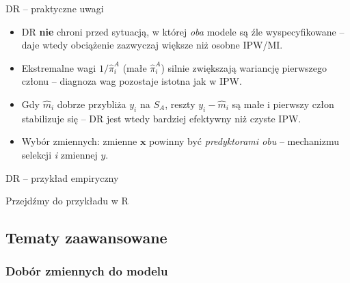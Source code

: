 \documentclass[10pt,ignorenonframetext, aspectratio=169]{beamer}
\newcommand{\bx}{\boldsymbol{x}}
\begin{document}
\begin{frame}{DR -- praktyczne uwagi}
\begin{itemize}
\justifying
    \item DR \textbf{nie} chroni przed sytuacją, w której \emph{oba} modele są źle wyspecyfikowane -- daje wtedy obciążenie zazwyczaj większe niż osobne IPW/MI.
    \item Ekstremalne wagi $1/\hat{\pi}_i^A$ (małe $\hat{\pi}_i^A$) silnie zwiększają wariancję pierwszego członu -- diagnoza wag pozostaje istotna jak w IPW.
    \item Gdy $\hat{m}_i$ dobrze przybliża $y_i$ na $S_A$, reszty $y_i - \hat{m}_i$ są małe i pierwszy człon stabilizuje się -- DR jest wtedy bardziej efektywny niż czyste IPW.
    \item Wybór zmiennych: zmienne $\bx$ powinny być \emph{predyktorami obu} -- mechanizmu selekcji \emph{i} zmiennej $y$.
\end{itemize}
\end{frame}

\begin{frame}{DR -- przykład empiryczny}
\begin{center}
Przejdźmy do przykładu w R
\end{center}
\end{frame}

\subsection{Tematy zaawansowane}

\subsubsection{Dobór zmiennych do modelu}
\end{document}
